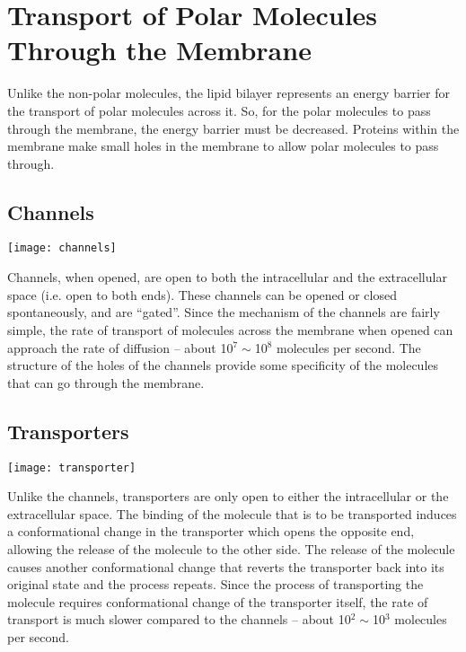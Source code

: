 \section{Transport of Polar Molecules Through the Membrane}

Unlike the non-polar molecules, the lipid bilayer represents an energy barrier for the transport of polar molecules across it.
So, for the polar molecules to pass through the membrane, the energy barrier must be decreased.
Proteins within the membrane make small holes in the membrane to allow polar molecules to pass through.

\subsection{Channels}

\begin{center}
\texttt{[image: channels]}
\end{center}

Channels, when opened, are open to both the intracellular and the extracellular space (i.e. open to both ends).
These channels can be opened or closed spontaneously, and are ``gated''.
Since the mechanism of the channels are fairly simple, the rate of transport of molecules across the membrane when opened can approach the rate of diffusion -- about 10$^7\sim$10$^8$ molecules per second.
The structure of the holes of the channels provide some specificity of the molecules that can go through the membrane.

\subsection{Transporters}

\begin{center}
\texttt{[image: transporter]}
\end{center}

Unlike the channels, transporters are only open to either the intracellular or the extracellular space.
The binding of the molecule that is to be transported induces a conformational change in the transporter which opens the opposite end, allowing the release of the molecule to the other side.
The release of the molecule causes another conformational change that reverts the transporter back into its original state and the process repeats.
Since the process of transporting the molecule requires conformational change of the transporter itself, the rate of transport is much slower compared to the channels -- about 10$^2\sim$10$^3$ molecules per second.

